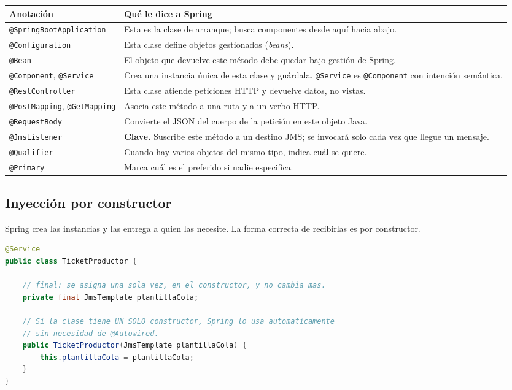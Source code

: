 \documentclass[11pt,a4paper]{book}
\begin{document}
\begin{center}
	\small
	\begin{tabularx}{\textwidth}{@{}p{4.4cm}X@{}}
		\toprule
		\textbf{Anotación} & \textbf{Qué le dice a Spring} \\
		\midrule
		\texttt{@SpringBootApplication} & Esta es la clase de arranque; busca componentes desde aquí hacia abajo. \\
		\texttt{@Configuration}         & Esta clase define objetos gestionados (\emph{beans}). \\
		\texttt{@Bean}                  & El objeto que devuelve este método debe quedar bajo gestión de Spring. \\
		\texttt{@Component}, \texttt{@Service} & Crea una instancia única de esta clase y guárdala. \texttt{@Service} es \texttt{@Component} con intención semántica. \\
		\texttt{@RestController}        & Esta clase atiende peticiones HTTP y devuelve datos, no vistas. \\
		\texttt{@PostMapping}, \texttt{@GetMapping} & Asocia este método a una ruta y a un verbo HTTP. \\
		\texttt{@RequestBody}           & Convierte el JSON del cuerpo de la petición en este objeto Java. \\
		\texttt{@JmsListener}           & \textbf{Clave.} Suscribe este método a un destino JMS; se invocará solo cada vez que llegue un mensaje. \\
		\texttt{@Qualifier}             & Cuando hay varios objetos del mismo tipo, indica cuál se quiere. \\
		\texttt{@Primary}               & Marca cuál es el preferido si nadie especifica. \\
		\bottomrule
	\end{tabularx}
\end{center}

\subsection{Inyección por constructor}

Spring crea las instancias y las entrega a quien las necesite.
La forma correcta de recibirlas es por constructor.

\begin{lstlisting}[language=Java,caption={Inyección por constructor},label={lst:inyeccion}]
@Service
public class TicketProductor {

	// final: se asigna una sola vez, en el constructor, y no cambia mas.
	private final JmsTemplate plantillaCola;

	// Si la clase tiene UN SOLO constructor, Spring lo usa automaticamente
	// sin necesidad de @Autowired.
	public TicketProductor(JmsTemplate plantillaCola) {
		this.plantillaCola = plantillaCola;
	}
}
\end{lstlisting}
\end{document}
